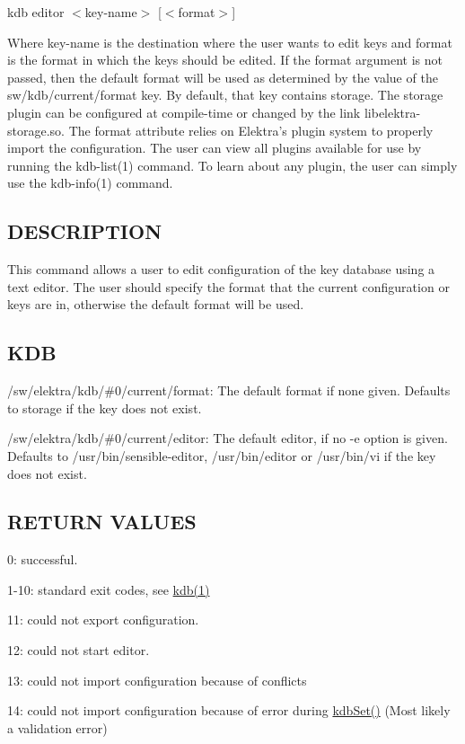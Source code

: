 {\ttfamily kdb editor $<$key-\/name$>$ \mbox{[}$<$format$>$\mbox{]}}

Where {\ttfamily key-\/name} is the destination where the user wants to edit keys and {\ttfamily format} is the format in which the keys should be edited. If the {\ttfamily format} argument is not passed, then the default format will be used as determined by the value of the {\ttfamily sw/kdb/current/format} key. By default, that key contains {\ttfamily storage}. The {\ttfamily storage} plugin can be configured at compile-\/time or changed by the link {\ttfamily libelektra-\/storage.\+so}. The {\ttfamily format} attribute relies on Elektra's plugin system to properly import the configuration. The user can view all plugins available for use by running the kdb-\/list(1) command. To learn about any plugin, the user can simply use the kdb-\/info(1) command.

\subsection*{D\+E\+S\+C\+R\+I\+P\+T\+I\+O\+N}

This command allows a user to edit configuration of the key database using a text editor. The user should specify the format that the current configuration or keys are in, otherwise the default format will be used.

\subsection*{K\+D\+B}


\begin{DoxyItemize}
\item {\ttfamily /sw/elektra/kdb/\#0/current/format}\+: The default format if none given. Defaults to {\ttfamily storage} if the key does not exist.
\item {\ttfamily /sw/elektra/kdb/\#0/current/editor}\+: The default editor, if no {\ttfamily -\/e} option is given. Defaults to {\ttfamily /usr/bin/sensible-\/editor}, {\ttfamily /usr/bin/editor} or {\ttfamily /usr/bin/vi} if the key does not exist.
\end{DoxyItemize}

\subsection*{R\+E\+T\+U\+R\+N V\+A\+L\+U\+E\+S}


\begin{DoxyItemize}
\item 0\+: successful.
\item 1-\/10\+: standard exit codes, see \hyperlink{md_doc_help_kdb_doc_help_kdb_md}{kdb(1)}
\item 11\+: could not export configuration.
\item 12\+: could not start editor.
\item 13\+: could not import configuration because of conflicts
\item 14\+: could not import configuration because of error during \hyperlink{group__kdb_ga11436b058408f83d303ca5e996832bcf}{kdb\+Set()} (Most likely a validation error)
\end{DoxyItemize}

